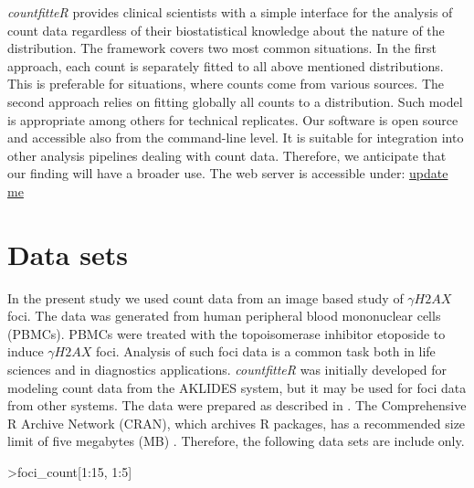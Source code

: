 \emph{countfitteR} provides clinical scientists with a simple interface for the analysis of count data regardless of their biostatistical knowledge about the nature of the distribution. The framework covers two most common situations. In the first approach, each count is separately fitted to all above mentioned distributions. This is preferable for situations, where counts come from various sources. The second approach relies on fitting globally all counts to a distribution. Such model is appropriate among others for technical replicates.
Our software is open source and accessible also from the command-line level. It is suitable for integration into other analysis pipelines dealing with count data. Therefore, we anticipate that our finding will have a broader use. 
The web server is accessible under: 
\url{update me}

\section{Data sets}
In the present study we used count data from an image based study of $\gamma H2AX$ foci. The data was generated from human peripheral blood mononuclear cells (PBMCs). PBMCs were treated with the topoisomerase inhibitor etoposide to induce $\gamma H2AX$ foci. Analysis of such foci data is a common task both in life sciences and in diagnostics applications. \emph{countfitteR} was initially developed for modeling count data from the AKLIDES system, but it may be used for foci data from other systems.
The data were prepared as described in \citep{rodiger_quantification_2018}. The Comprehensive R Archive Network (CRAN), which archives R packages, has a recommended size limit of five megabytes (MB) \citep{anderson_hosting_2017}. Therefore, the following data sets are include only.

\newpage

{\bfseries
\begin{example}
>foci_count[1:15, 1:5]
\end{example}
}

